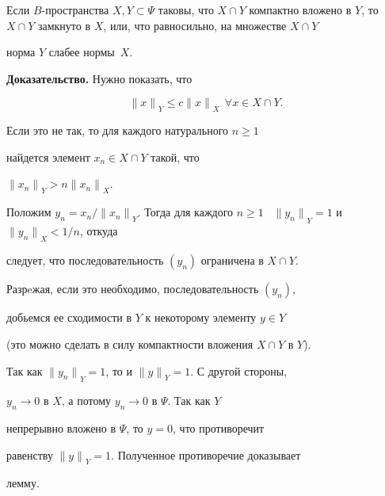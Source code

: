 \begin{lems} \label{XYcompY}


Если $B$-пространства $X, Y \subset


\Psi$ таковы, что $X \cap Y$ компактно вложено в $Y$, то $X \cap


Y$ замкнуто в $X$, или, что равносильно, на множестве $X \cap Y$


норма $Y$ слабее нормы~$X$.


\end{lems}





{\bf Доказательство.} Нужно показать, что


$$


{\|x\|}_Y \leq c {\|x\|}_X \ \ \forall x \in X \cap Y.


$$


Если это не так, то для каждого натурального $n \ge 1$


найдется элемент $x_n \in X \cap Y$ такой, что


${\|x_n\|}_Y > n {\|x_n\|}_X$.


Положим $y_n=x_n / {\|x_n\|}_Y$. Тогда для каждого $n


\ge 1$ \ ${\|y_n\|}_Y=1$ и ${\|y_n\|}_X < 1/n$, откуда


следует, что последовательность $(y_n)$ ограничена в $X \cap Y$.


Разрeжая, если это необходимо, последовательность $(y_n)$,


добьемся ее сходимости в $Y$ к некоторому элементу $y \in Y$


(это можно сделать в силу компактности вложения $X \cap Y$ в $Y$).


Так как ${\|y_n\|}_Y=1$, то и ${\|y\|}_Y=1$. С другой стороны,


$y_n \to 0$ в $X$, а потому $y_n \to 0$ в $\Psi$. Так как $Y$


непрерывно вложено в $\Psi$, то $y=0$, что противоречит


равенству ${\|y\|}_Y=1$. Полученное противоречие доказывает


лемму.








